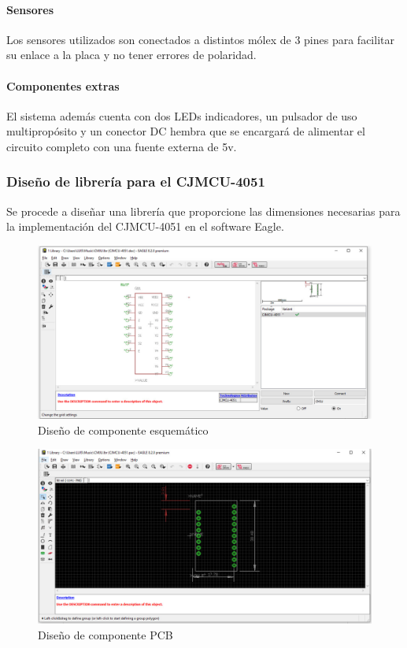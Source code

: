 \documentclass[10pt,a4paper]{article}
\begin{document}
\paragraph{Sensores} Los sensores utilizados son conectados a distintos mólex de 3 pines para facilitar su enlace a la placa y no tener errores de polaridad.
\paragraph{Componentes extras} El sistema además cuenta con dos LEDs indicadores, un pulsador de uso multipropósito y un conector DC hembra que se encargará de alimentar el circuito completo con una fuente externa de 5v.

\subsubsection*{Diseño de librería para el CJMCU-4051}
Se procede a diseñar una librería que proporcione las dimensiones necesarias para la implementación del CJMCU-4051 en el software Eagle.
\begin{figure}[H]
\centering
\includegraphics[scale=0.4]{mux1.jpeg}
\caption{Diseño de componente esquemático}
\end{figure}
\begin{figure}[H]
\centering
\includegraphics[scale=0.4]{mux3.jpeg}
\caption{Diseño de componente PCB}
\end{figure}
\end{document}
